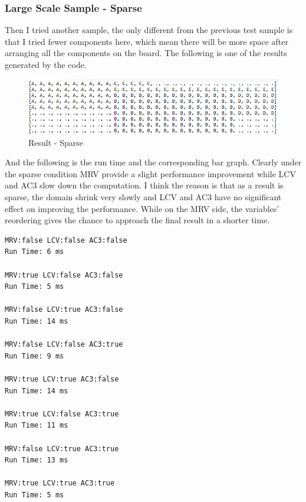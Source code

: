 \documentclass{article}
\begin{document}
\subsubsection{Large Scale Sample - Sparse}
Then I tried another sample, the only different from the previous test sample is that I tried fewer components here, which mean there will be more space after arranging all the components on the board. The following is one of the results generated by the code.

\begin{figure}[H]
\centering
\includegraphics[width=\linewidth]{SparseResult}
\caption{Result - Sparse}
\end{figure}

And the following is the run time and the corresponding bar graph. Clearly under the sparse condition MRV provide a slight performance improvement while LCV and AC3 slow down the computation. I think the reason is that as a result is sparse, the domain shrink very slowly and LCV and AC3 have no significant effect on improving the performance. While on the MRV side, the variables' reordering gives the chance to approach the final result in a shorter time.
\begin{lstlisting}
MRV:false LCV:false AC3:false
Run Time: 6 ms

MRV:true LCV:false AC3:false
Run Time: 5 ms

MRV:false LCV:true AC3:false
Run Time: 14 ms

MRV:false LCV:false AC3:true
Run Time: 9 ms

MRV:true LCV:true AC3:false
Run Time: 14 ms

MRV:true LCV:false AC3:true
Run Time: 11 ms

MRV:false LCV:true AC3:true
Run Time: 13 ms

MRV:true LCV:true AC3:true
Run Time: 5 ms
\end{lstlisting}
\end{document}
